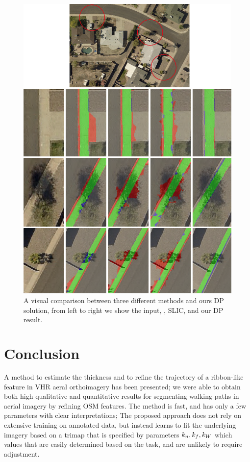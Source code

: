 \begin{figure}[htb]
    \centering
    \includegraphics[width=0.95\columnwidth]{Figures/2_comparison_needed.png}
    \caption[Methods Comparison on More Sample Sidewalk]{A visual comparison between three different methods and ours \ac{DP} solution, from left to right we show the input, \GrabCut{}, \ac{SLIC}, \ActiveContours{} and our \ac{DP} result.}
    \label{fig:Sample_2_compare}
\end{figure}

\section{Conclusion}

A method to estimate the thickness and to refine the trajectory of a ribbon-like feature in \ac{VHR} aeral orthoimagery has been presented; we were able to obtain both high qualitative and quantitative results for segmenting walking paths in aerial imagery by refining \ac{OSM} features. The method is fast, and has only a few parameters with clear interpretations;
The proposed approach does not rely on extensive training on annotated data, but instead learns to fit the underlying imagery based on a trimap that is specified by parameters $k_n{}, k_f{}, k_W{}$ which values that are easily determined based on the task, and are unlikely to require adjustment. 

